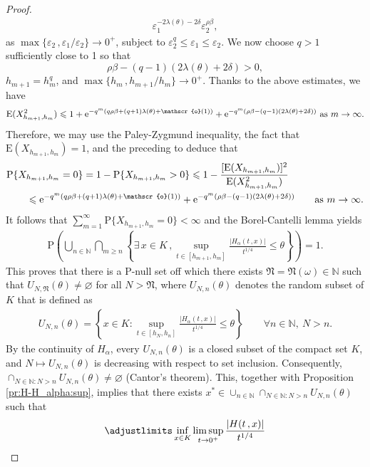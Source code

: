 \documentclass[reqno]{amsart}
\newcommand{\<}{\langle}
\renewcommand{\>}{\rangle}
\newcommand{\N}{\mathbb{N}}
\renewcommand{\P}{\mathrm{P}}
\newcommand{\E}{\mathrm{E}}
\newcommand{\1}{\mathbb{1}}
\newcommand{\e}{{\rm e}}
\renewcommand{\ge}{\geqslant}
\renewcommand{\le}{\leqslant}
\theoremstyle{definition}
\numberwithin{equation}{section}
\begin{document}
\begin{proof}
\begin{align*}
			\varepsilon_1^{-2\lambda(\theta)-2\delta} \varepsilon_2^{\rho \beta},
	\end{align*}
	as $\max\{\varepsilon_2\,,\varepsilon_1/\varepsilon_2\} \to 0^+$, 
	subject to $\varepsilon_2^q \le \varepsilon_1\le \varepsilon_2$.
	We now choose $q>1$ sufficiently close to 1 so that 
	\[
		\rho\beta - (q-1) (2\lambda(\theta)+2\delta)>0,
	\]
	$h_{m+1} = h_m^q$, and $\max\{h_m\,,h_{m+1}/h_m\} \to 0^+$.
	Thanks to the above estimates, we have
	\[
		\E(X_{h_{m+1},h_m}^2) 
		\le 1+ \e^{-q^m(q\rho\beta+(q+1)\lambda(\theta) + 
		\mathscr{o}(1))} + \e^{-q^m(\rho\beta - (q-1)(2\lambda(\theta)+2\delta))} 
		 \text{ as $m\to\infty$.}
	\]
	Therefore, we may use the Paley-Zygmund inequality, 
	the fact that $\E(X_{h_{m+1},h_m})=1$, and the preceding to deduce that
	\begin{align*}
		&\P\{X_{h_{m+1},h_m}=0\}
		= 1- \P\{X_{h_{m+1},h_m}>0\}
			\le 1-\frac{[\E(X_{h_{m+1},h_m})]^2}{\E(X_{h_{m+1},h_m}^2)}\\
		&\qquad \le \e^{-q^m(q\rho\beta+(q+1)\lambda(\theta) + \mathscr{o}(1))} 
			+ \e^{-q^m(\rho\beta - (q-1)(2\lambda(\theta)+2\delta))} 
		\qquad \text{as $m\to\infty$.}
	\end{align*}
	It follows that $\sum_{m=1}^\infty \P\{X_{h_{m+1},h_m}=0\}<\infty$
	and the Borel-Cantelli lemma yields
	\begin{align*}
		\P\left( \bigcup_{n \in \N} \bigcap_{m \ge n} 
		\left\{ \exists\, x \in K\,, \sup_{t \in [h_{m+1},h_m]}
		\frac{|H_\alpha(t\,,x)|}{t^{1/4}} \le \theta \right\} \right)
		=1.
	\end{align*}
	This proves that there is a $\P$-null set off which there exists 
	$\mathfrak{N}=\mathfrak{N}(\omega) \in \N$ such that $U_{N,\mathfrak{N}}(\theta) \ne \varnothing$
	for all $N>\mathfrak{N}$, where $U_{N,n}(\theta)$ denotes the random subset of $K$
	that is defined as
	\begin{align*}
		U_{N,n}(\theta)  =  \left\{ x \in K : \sup_{t \in 
		[h_N,h_n]}\frac{|H_{\alpha}(t\,,x)|}{t^{1/4}}\le \theta \right\}
		\qquad\forall n\in\N,\ N>n.
	\end{align*}
	By the continuity of $H_{\alpha}$, every $U_{N,n}(\theta)$ 
	is a closed subset of the compact set $K$, and $N\mapsto U_{N,n}(\theta)$
	is decreasing with respect to set inclusion. Consequently,
	$\cap_{N \in \N: N>n} U_{N,n}(\theta)\neq\varnothing$ (Cantor's  theorem).
	This, together with Proposition \ref{pr:H-H_alpha:sup}, implies
	that there exists $x^*\in \cup_{n\in\N}
	\cap_{N \in \N: N>n} U_{N,n}(\theta)$ such that
	\[
		\adjustlimits\inf_{x \in K} \limsup_{t\to0^+} \frac{|H(t\,,x)|}{t^{1/4}}
\]
\end{proof}
\end{document}
